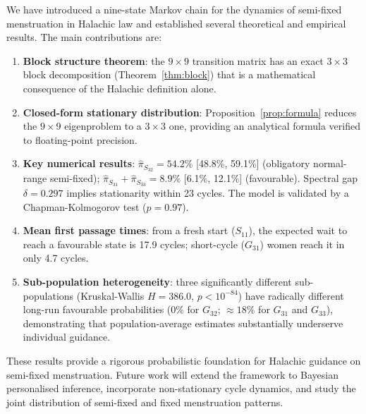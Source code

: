 \documentclass[12pt,a4paper]{article}
\begin{document}
We have introduced a nine-state Markov chain for the dynamics of semi-fixed
menstruation in Halachic law and established several theoretical and empirical
results.  The main contributions are:

\begin{enumerate}
  \item \textbf{Block structure theorem}: the $9\times9$ transition matrix has
        an exact $3\times3$ block decomposition (Theorem~\ref{thm:block}) that
        is a mathematical consequence of the Halachic definition alone.

  \item \textbf{Closed-form stationary distribution}: Proposition~\ref{prop:formula}
        reduces the $9\times9$ eigenproblem to a $3\times3$ one, providing an
        analytical formula verified to floating-point precision.

  \item \textbf{Key numerical results}:
        $\hat{\pi}_{S_{32}} = 54.2\%$ [48.8\%, 59.1\%] (obligatory normal-range
        semi-fixed); $\hat{\pi}_{S_{31}}+\hat{\pi}_{S_{33}} = 8.9\%$
        [6.1\%, 12.1\%] (favourable).
        Spectral gap $\delta = 0.297$ implies stationarity within 23 cycles.
        The model is validated by a Chapman-Kolmogorov test ($p = 0.97$).

  \item \textbf{Mean first passage times}: from a fresh start ($S_{11}$), the
        expected wait to reach a favourable state is 17.9 cycles;
        short-cycle ($G_{31}$) women reach it in only 4.7 cycles.

  \item \textbf{Sub-population heterogeneity}: three significantly different
        sub-populations (Kruskal-Wallis $H=386.0$, $p<10^{-84}$) have
        radically different long-run favourable probabilities (0\% for $G_{32}$;
        $\approx18\%$ for $G_{31}$ and $G_{33}$), demonstrating that
        population-average estimates substantially underserve individual guidance.
\end{enumerate}

These results provide a rigorous probabilistic foundation for Halachic guidance
on semi-fixed menstruation.  Future work will extend the framework to
Bayesian personalised inference, incorporate non-stationary cycle dynamics,
and study the joint distribution of semi-fixed and fixed menstruation patterns.

\end{document}
